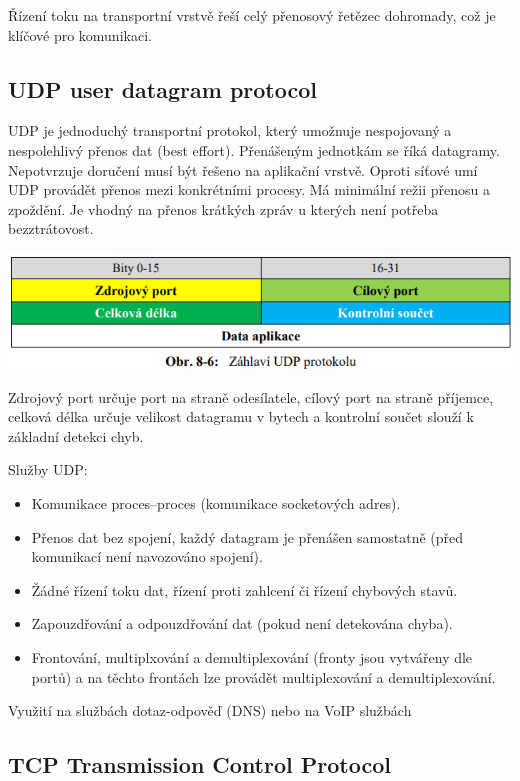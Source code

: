 Řízení toku  na transportní vrstvě řeší celý přenosový řetězec dohromady, což je klíčové pro komunikaci.


\subsection{UDP user datagram protocol}

UDP je jednoduchý transportní protokol, který umožnuje nespojovaný a nespolehlivý přenos dat (best effort). Přenášeným jednotkám se říká datagramy. Nepotvrzuje doručení musí být řešeno na aplikační vrstvě. Oproti síťové umí UDP provádět přenos mezi konkrétními procesy. Má minimální režii přenosu a zpoždění. Je vhodný na přenos krátkých zpráv u kterých není potřeba bezztrátovost. 

\begin{center}
\includegraphics[scale = 0.5]{images/-050.png}
\end{center}

Zdrojový port určuje port na straně odesílatele, cílový port na straně příjemce, celková délka určuje velikost datagramu v bytech a kontrolní součet slouží k základní detekci chyb.

Služby UDP:
\begin{itemize}[noitemsep]
    \item Komunikace proces--proces (komunikace socketových adres).
    \item Přenos dat bez spojení, každý datagram je přenášen samostatně (před komunikací není navozováno spojení).
    \item Žádné řízení toku dat, řízení proti zahlcení či řízení chybových stavů.
    \item Zapouzdřování a odpouzdřování dat (pokud není detekována chyba).
    \item Frontování, multiplxování a demultiplexování (fronty jsou vytvářeny dle portů) a na těchto frontách lze provádět multiplexování a demultiplexování.
\end{itemize}

Využití na službách dotaz-odpověď (DNS) nebo na VoIP službách

\subsection{TCP Transmission Control Protocol}

